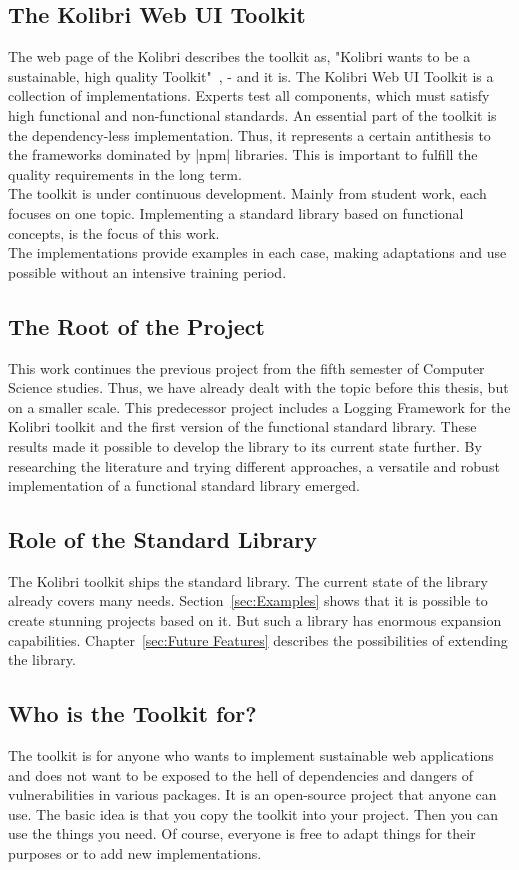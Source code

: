 \subsection{The Kolibri Web UI Toolkit}
\label{The Kolibri Web UI Toolkit}
The web page of the Kolibri describes the toolkit as, "Kolibri wants to be a
sustainable, high quality Toolkit"~\cite{kolibri}, - and it is.
The Kolibri Web UI Toolkit is a collection of implementations. Experts test all
components, which must satisfy high functional and non-functional standards. An
essential part of the toolkit is the dependency-less implementation. Thus, it
represents a certain antithesis to the frameworks dominated by |npm| libraries.
This is important to fulfill the quality requirements in the long term.\\
The toolkit is under continuous development. Mainly from student work, each
focuses on one topic. Implementing a standard library based on functional
concepts, is the focus of this work. \\ 
The implementations provide examples in each case, making adaptations and use
possible without an intensive training period.

\subsection{The Root of the Project}
\label{The Root of the Project}
This work continues the previous project from the fifth semester of Computer
Science studies. Thus, we have already dealt with the topic before this thesis,
but on a smaller scale. This predecessor project includes a Logging Framework
for the Kolibri toolkit and the first version of the functional standard
library. These results made it possible to develop the library to its current
state further. By researching the literature and trying different approaches, a
versatile and robust implementation of a functional standard library emerged.

\subsection{Role of the Standard Library}
\label{sub:Role of the Standard Library}
The Kolibri toolkit ships the standard library. The current state of the
library already covers many needs. Section~\ref{sec:Examples} shows that it is
possible to create stunning projects based on it. But such a library has
enormous expansion capabilities. Chapter~\ref{sec:Future Features} describes
the possibilities of extending the library.

\subsection{Who is the Toolkit for?}
\label{sub:Who is the Toolkit for?}
The toolkit is for anyone who wants to implement sustainable web applications 
and does not want to be exposed to the hell of dependencies and dangers
of vulnerabilities in various packages. It is an open-source project that
anyone can use. The basic idea is that you copy the toolkit into your project.
Then you can use the things you need. Of course, everyone is free to adapt
things for their purposes or to add new implementations.
